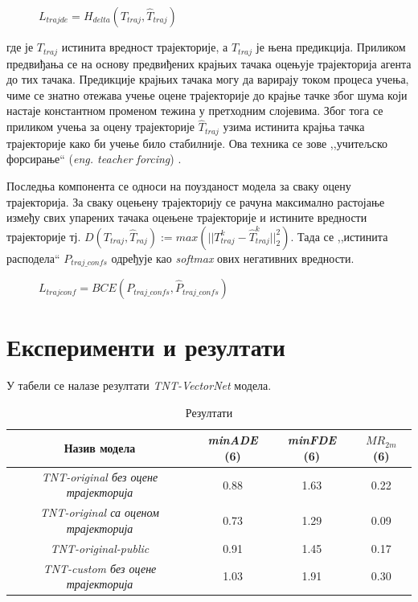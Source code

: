 \documentclass[11pt,oneside]{memoir}
\begin{document}
\begin{figure}[H]
  \centering
  $L_{trajde} = H_{delta} (T_{traj}, \hat{T}_{traj})$
\end{figure}

\noindent где је $T_{traj}$ истинита вредност трајекторије, а $\hat{T}_{traj}$ је њена предикција. Приликом предвиђања се
на основу предвиђених крајњих тачака оцењује трајекторија агента до тих тачака. Предикције крајњих тачака могу да варирају током процеса учења,
чиме се знатно отежава учење оцене трајекторије до крајње тачке због шума који настаје константном променом тежина у претходним слојевима.
Због тога се приликом учења за оцену трајекторије
$\hat{T}_{traj}$ узима истинита крајња тачка трајекторије како би учење било стабилније. Ова техника се зове ,,учитељско форсирање`` (\textit{eng. teacher forcing}) \cite{teacher_forcing}.

Последња компонента се односи на поузданост модела за сваку оцену трајекторија. За сваку оцењену трајекторију се рачуна максимално растојање
између свих упарених тачака оцењене трајекторије и истините вредности трајекторије тј.
$D(T_{traj}, \hat{T}_{raj}) := max(||T^{k}_{traj} - \hat{T}^{k}_{traj}||^{2}_{2})$. Тада се ,,истинита расподела`` $P_{traj\_confs}$ одређује као \textit{softmax} 
ових негативних вредности.

\begin{figure}[H]
  \centering
  $L_{trajconf} = BCE(P_{traj\_confs}, \hat{P}_{traj\_confs})$
\end{figure}

\section{Експерименти и резултати}

У табели  се налазе резултати \textit{TNT-VectorNet} модела. 

\begin{table}[H]
  \begin{tabular}{c|c|c|c}
    Назив модела & \textit{minADE} (6) & \textit{minFDE} (6) & $MR_{2m}$ (6) \\
    \hline
    \textit{TNT-original без оцене трајекторија} & 0.88 & 1.63 & 0.22 \\
    \textit{TNT-original са оценом трајекторија} & 0.73 & 1.29 & 0.09 \\
    \textit{TNT-original-public} & 0.91 & 1.45 & 0.17 \\
    \textit{TNT-custom без оцене трајекторија}  & 1.03 & 1.91 & 0.30
  \end{tabular}
  \caption{Резултати}
  \label{vectornet-results}
\end{table}
\end{document}
